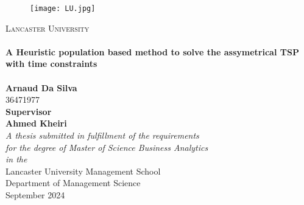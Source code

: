 \begin{titlepage}
\begin{center}

\begin{figure}[htbp]
\centering
\texttt{[image: LU.jpg]}
\end{figure}

\textsc{\LARGE Lancaster University}\\[0.7cm] 
\HRule \\[0.4cm]
{\huge \bfseries A Heuristic population based method to solve the assymetrical TSP with time constraints}\\[0.4cm]
\HRule \\[0.4cm]
{\LARGE \bfseries Arnaud Da Silva}\\[0.4cm]
{\LARGE  36471977}\\[1cm]
{\large  \bfseries Supervisor }\\[0.4cm]
{\large \bfseries Ahmed Kheiri}\\[1cm]
\large \textit{A thesis submitted in fulfillment of the requirements\\ for the degree of Master of Science Business Analytics}\\[0.3cm] %
\textit{in the}\\[0.4cm]
Lancaster University Management School \\
Department of Management Science\\[1cm] %
{\large September 2024}\\[4cm]
\vfill
\end{center}
\end{titlepage}
